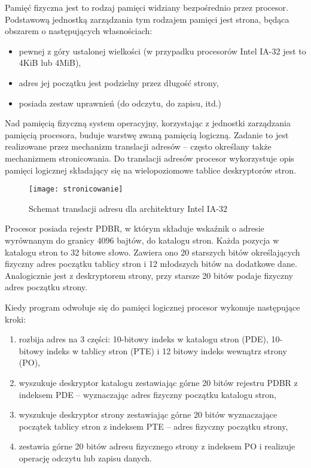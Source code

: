 \documentclass[12pt,a4paper,titlepage,twoside]{mwart}
\begin{document}
Pamięć fizyczna jest to rodzaj pamięci widziany bezpośrednio przez procesor.
Podstawową jednostką zarządzania tym rodzajem pamięci jest strona, będąca
obszarem o następujących własnościach:

\begin{itemize}
\item pewnej z góry ustalonej wielkości (w przypadku procesorów Intel
IA-32 jest to 4KiB lub 4MiB),
\item adres jej początku jest podzielny przez długość strony,
\item posiada zestaw uprawnień (do odczytu, do zapisu, itd.)
\end{itemize}

Nad pamięcią fizyczną system operacyjny, korzystając z jednostki zarządzania
pamięcią procesora, buduje warstwę zwaną pamięcią logiczną. Zadanie to jest
realizowane przez mechanizm translacji adresów -- często określany także
mechanizmem stronicowania. Do translacji adresów procesor wykorzystuje opis
pamięci logicznej składający się na wielopoziomowe tablice deskryptorów stron.

\begin{figure}[h]
\centering
\texttt{[image: stronicowanie]}
\caption{Schemat translacji adresu dla architektury Intel IA-32}
\end{figure}

Procesor posiada rejestr PDBR, w którym składuje wskaźnik o adresie wyrównanym
do granicy 4096 bajtów, do katalogu stron. Każda pozycja w katalogu stron to 32
bitowe słowo. Zawiera ono 20 starszych bitów określających fizyczny adres
początku tablicy stron i 12 młodszych bitów na dodatkowe dane. Analogicznie
jest z deskryptorem strony, przy starsze 20 bitów podaje fizyczny adres
początku strony.

Kiedy program odwołuje się do pamięci logicznej procesor wykonuje następujące kroki:
\begin{enumerate}
\item rozbija adres na 3 części: 10-bitowy indeks w katalogu stron (PDE), 10-bitowy
indeks w tablicy stron (PTE) i 12 bitowy indeks wewnątrz strony (PO),
\item wyszukuje deskryptor katalogu zestawiając górne 20 bitów rejestru PDBR z
indeksem PDE -- wyznaczając adres fizyczny początku katalogu stron,
\item wyszukuje deskryptor strony zestawiając górne 20 bitów wyznaczające
początek tablicy stron z indeksem PTE -- adres fizyczny początku strony,
\item zestawia górne 20 bitów adresu fizycznego strony z indeksem PO i
realizuje operację odczytu lub zapisu danych.
\end{enumerate}
\end{document}
